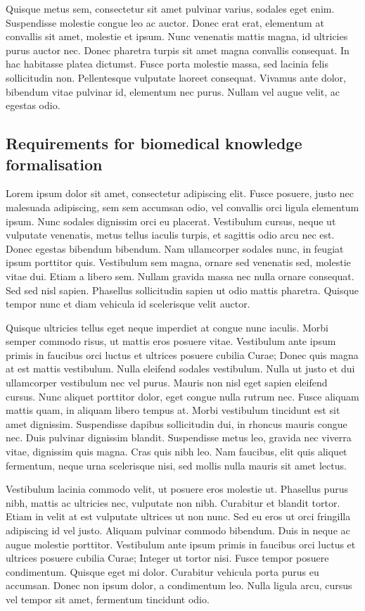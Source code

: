 Quisque metus sem, consectetur sit amet pulvinar varius, sodales eget enim. Suspendisse molestie congue leo ac auctor. Donec erat erat, elementum at convallis sit amet, molestie et ipsum. Nunc venenatis mattis magna, id ultricies purus auctor nec. Donec pharetra turpis sit amet magna convallis consequat. In hac habitasse platea dictumst. Fusce porta molestie massa, sed lacinia felis sollicitudin non. Pellentesque vulputate laoreet consequat. Vivamus ante dolor, bibendum vitae pulvinar id, elementum nec purus. Nullam vel augue velit, ac egestas odio.

\subsection{Requirements for biomedical knowledge formalisation}

Lorem ipsum dolor sit amet, consectetur adipiscing elit. Fusce posuere, justo nec malesuada adipiscing, sem sem accumsan odio, vel convallis orci ligula elementum ipsum. Nunc sodales dignissim orci eu placerat. Vestibulum cursus, neque ut vulputate venenatis, metus tellus iaculis turpis, et sagittis odio arcu nec est. Donec egestas bibendum bibendum. Nam ullamcorper sodales nunc, in feugiat ipsum porttitor quis. Vestibulum sem magna, ornare sed venenatis sed, molestie vitae dui. Etiam a libero sem. Nullam gravida massa nec nulla ornare consequat. Sed sed nisl sapien. Phasellus sollicitudin sapien ut odio mattis pharetra. Quisque tempor nunc et diam vehicula id scelerisque velit auctor.

Quisque ultricies tellus eget neque imperdiet at congue nunc iaculis. Morbi semper commodo risus, ut mattis eros posuere vitae. Vestibulum ante ipsum primis in faucibus orci luctus et ultrices posuere cubilia Curae; Donec quis magna at est mattis vestibulum. Nulla eleifend sodales vestibulum. Nulla ut justo et dui ullamcorper vestibulum nec vel purus. Mauris non nisl eget sapien eleifend cursus. Nunc aliquet porttitor dolor, eget congue nulla rutrum nec. Fusce aliquam mattis quam, in aliquam libero tempus at. Morbi vestibulum tincidunt est sit amet dignissim. Suspendisse dapibus sollicitudin dui, in rhoncus mauris congue nec. Duis pulvinar dignissim blandit. Suspendisse metus leo, gravida nec viverra vitae, dignissim quis magna. Cras quis nibh leo. Nam faucibus, elit quis aliquet fermentum, neque urna scelerisque nisi, sed mollis nulla mauris sit amet lectus.

Vestibulum lacinia commodo velit, ut posuere eros molestie ut. Phasellus purus nibh, mattis ac ultricies nec, vulputate non nibh. Curabitur et blandit tortor. Etiam in velit at est vulputate ultrices ut non nunc. Sed eu eros ut orci fringilla adipiscing id vel justo. Aliquam pulvinar commodo bibendum. Duis in neque ac augue molestie porttitor. Vestibulum ante ipsum primis in faucibus orci luctus et ultrices posuere cubilia Curae; Integer ut tortor nisi. Fusce tempor posuere condimentum. Quisque eget mi dolor. Curabitur vehicula porta purus eu accumsan. Donec non ipsum dolor, a condimentum leo. Nulla ligula arcu, cursus vel tempor sit amet, fermentum tincidunt odio.

